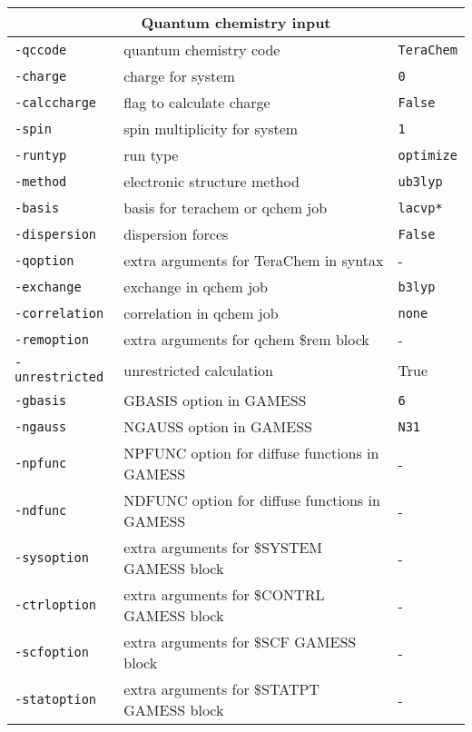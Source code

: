 \documentclass[a4paper,12pt]{assignment}
\begin{document}
\begin{tabular}{|l|l|l|}
\hline
 \multicolumn{3}{|c|}{\Large \textbf{Quantum chemistry input}}\\ \hline 
\texttt{-qccode} & quantum chemistry code & \texttt{TeraChem} \\
\texttt{-charge} & charge for system & \texttt{0} \\
\texttt{-calccharge} & flag to calculate charge & \texttt{False} \\
\texttt{-spin} & spin multiplicity for system  & \texttt{1} \\
\texttt{-runtyp} & run type  & \texttt{optimize} \\
\texttt{-method} & electronic structure method & \texttt{ub3lyp} \\
\texttt{-basis} & basis for terachem or qchem job  & \texttt{lacvp*} \\
\texttt{-dispersion} & dispersion forces & \texttt{False} \\
\texttt{-qoption} & extra arguments for TeraChem in syntax& - \\
\texttt{-exchange} & exchange in qchem job  & \texttt{b3lyp} \\
\texttt{-correlation} & correlation in qchem job  & \texttt{none} \\
\texttt{-remoption} & extra arguments for qchem \$rem block& - \\
\texttt{-unrestricted} & unrestricted calculation & True \\
\texttt{-gbasis} & GBASIS option in GAMESS & \texttt{6} \\
\texttt{-ngauss} & NGAUSS option in GAMESS  & \texttt{N31} \\
\texttt{-npfunc} & NPFUNC option for diffuse functions in GAMESS  & - \\
\texttt{-ndfunc} & NDFUNC option for diffuse functions in GAMESS  & - \\
\texttt{-sysoption} & extra arguments for \$SYSTEM GAMESS block & - \\
\texttt{-ctrloption} & extra arguments for \$CONTRL GAMESS block & - \\
\texttt{-scfoption} & extra arguments for \$SCF GAMESS block & - \\
\texttt{-statoption} & extra arguments for \$STATPT GAMESS block & - \\
\hline
\end{tabular}
\end{document}

